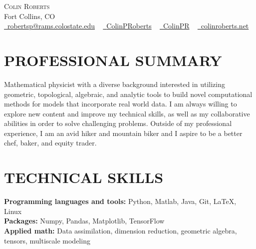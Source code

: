 \documentclass[letterpaper,11pt]{article}
\newcommand{\accentcolor}[1]{\textcolor{accentcolor}{#1}}
\begin{document}


\begin{center}
    {\Huge \scshape Colin Roberts} \\ \vspace{1pt}
    Fort Collins, CO \\ \vspace{1pt}
    \href{mailto:robertsp@rams.colostate.edu}{\faEnvelope \ \accentcolor{robertsp@rams.colostate.edu}} ~
    \href{https://www.linkedin.com/in/colinproberts/}{\faLinkedinSquare \ \accentcolor{ColinPRoberts}}  ~
    \href{https://github.com/ColinPR}{\faGithub \ \accentcolor{ColinPR}} ~
    \href{https://www.colinroberts.net}{\faGreaterThan \ \accentcolor{colinroberts.net}}
\end{center}


\section{PROFESSIONAL SUMMARY}
    Mathematical physicist with a diverse background interested in utilizing geometric, topological, algebraic, and analytic tools to build novel computational methods for models that incorporate real world data. I am always willing to explore new content and improve my technical skills, as well as my collaborative abilities in order to solve challenging problems. Outside of my professional experience, I am an avid hiker and mountain biker and I aspire to be a better chef, baker, and equity trader.

\section{TECHNICAL SKILLS}
 \begin{itemize}[leftmargin=0in, label={}]
    \small{\item{
     \textbf{\normalsize{Programming languages and tools:}}{ \normalsize{Python, Matlab, Java, Git, \LaTeX, Linux}} \\
     \textbf{\normalsize{Packages:}}{ \normalsize{Numpy, Pandas, Matplotlib, TensorFlow}} \\
     \textbf{\normalsize{Applied math:}}{ \normalsize{Data assimilation, dimension reduction, geometric algebra, tensors, multiscale modeling}} \\
    }}
 \end{itemize}
 \vspace{-15pt}
\end{document}
